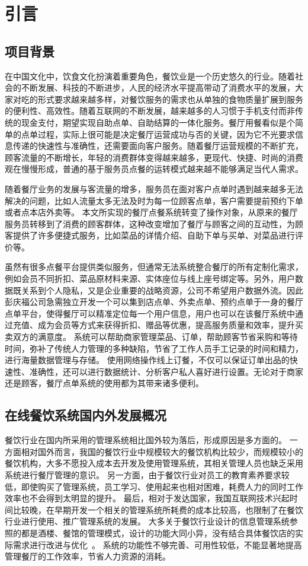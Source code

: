 \chapter{引言}

\section{项目背景}
在中国文化中，饮食文化扮演着重要角色，餐饮业是一个历史悠久的行业。随着社会的不断发展、科技的不断进步，人民的经济水平提高带动了消费水平的发展，大家对吃的形式要求越来越多样，对餐饮服务的需求也从单独的食物质量扩展到服务的便利性、高效性。随着互联网的不断发展，越来越多的人习惯于手机支付而非传统的现金支付，期望实现自助点单、自助结算的一体化服务。餐厅用餐看似是个简单的点单过程，实际上很可能是决定餐厅运营成功与否的关键，因为它不光要求信息传递的快速性与准确性，还需要面向客户服务。随着餐厅运营规模的不断扩充，顾客流量的不断增长，年轻的消费群体变得越来越多，更现代、快捷、时尚的消费观在慢慢形成，普通的基于服务员点餐的运转模式越来越不能够满足当代人需求。

随着餐厅业务的发展与客流量的增多，服务员在面对客户点单时遇到越来越多无法解决的问题，比如人流量太多无法及时为每一位顾客点单，客户需要提前预约下单或者点本店外卖等。
本文所实现的餐厅点餐系统转变了操作对象，从原来的餐厅服务员转移到了消费的顾客群体，这种改变增加了餐厅与顾客之间的互动性，为顾客提供了许多便捷式服务，比如菜品的详情介绍、自助下单与买单、对菜品进行评价等。

虽然有很多点餐平台提供类似服务，但通常无法系统整合餐厅的所有定制化需求，例如会员不同折扣、菜品原材料来源、实体座位与线上座号绑定等。另外，用户数据既关系到个人隐私，又是企业重要的战略资源，公司不希望用户数据外流。因此彭庆福公司急需独立开发一个可以集到店点单、外卖点单、预约点单于一身的餐厅点单平台，使得餐厅可以精准定位每一个用户信息，用户也可以在该餐厅系统中通过充值、成为会员等方式来获得折扣、赠品等优惠，提高服务质量和效率，提升买卖双方的满意度。
系统可以帮助商家管理菜品、订单，帮助顾客节省采购和等待时间，弥补了传统人力管理的多种缺陷，节省了工作人员手工记录的时间和精力，进行海量数据管理与存储。
使用网络操作线上订餐，不仅可以保证订单出品的快速性、准确性，还可以进行数据统计、分析客户私人喜好进行设置。无论对于商家还是顾客，餐厅点单系统的使用都为其带来诸多便利。

\section{在线餐饮系统国内外发展概况}
餐饮行业在国内所采用的管理系统相比国外较为落后，形成原因是多方面的。
一方面相对国外而言，我国的餐饮行业中规模较大的餐饮机构比较少，而规模较小的餐饮机构，大多不愿投入成本去开发及使用管理系统，其相关管理人员也缺乏采用系统进行餐厅管理的意识。
另一方面，由于餐饮行业对员工的教育素养要求较低，即使购买了管理系统，员工学习、使用起来也相对困难，耗费人力的同时工作效率也不会得到太明显的提升。
最后，相对于发达国家，我国互联网技术兴起时间比较晚，在早期开发一个相关的管理系统所耗费的成本比较高，也限制了在餐饮行业进行使用、推广管理系统的发展。
大多关于餐饮行业设计的信息管理系统参照的都是酒楼、餐馆的管理模式，设计的功能大同小异，没有结合具体餐饮店的实际需求进行改进与优化~\cite{DBLP:series/txcs/Voorhees20}。
系统的功能性不够完善、可用性较低，不能显著地提高管理餐厅的工作效率，节省人力资源的消耗。

